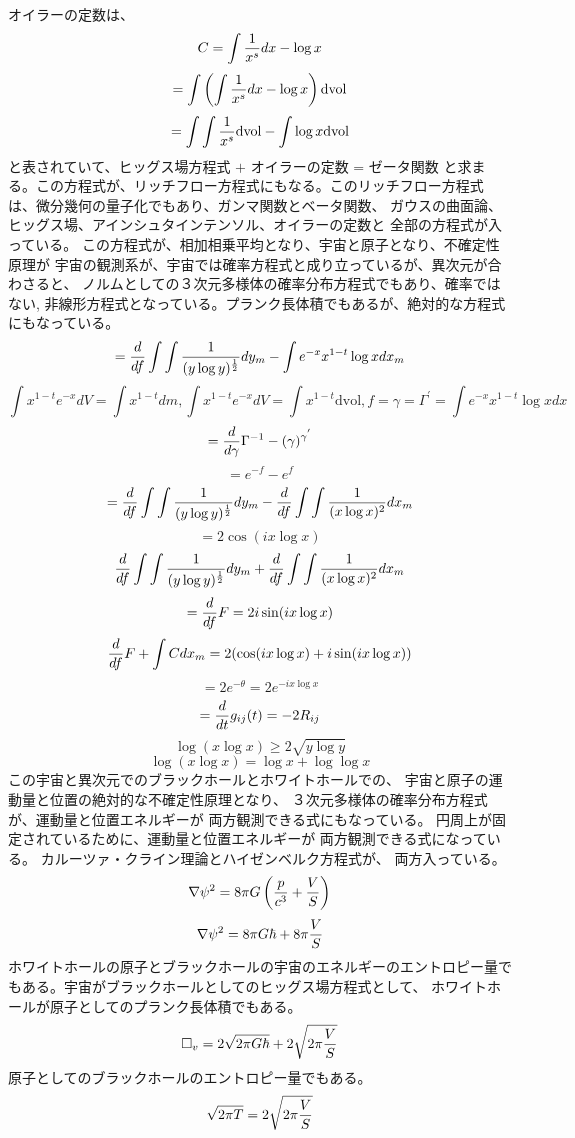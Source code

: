 \documentclass{jsarticle}
\begin{document}
{  オイラーの定数は、
  $$ C = \int {1 \over x^s}dx - \log x $$
  $$ = \int \left(\int {1 \over x^s}dx - \log x \right)\mathrm{dvol} $$
  $$ = \int \int{1 \over x^s}\mathrm{dvol} - \int  \log x \mathrm{dvol} $$
  と表されていて、$ \text{ヒッグス場方程式 + オイラーの定数 = ゼータ関数} $
  と求まる。この方程式が、リッチフロー方程式にもなる。このリッチフロー方程式
  は、微分幾何の量子化でもあり、ガンマ関数とベータ関数、
  ガウスの曲面論、ヒッグス場、アインシュタインテンソル、オイラーの定数と
  全部の方程式が入っている。
  この方程式が、相加相乗平均となり、宇宙と原子となり、不確定性原理が
  宇宙の観測系が、宇宙では確率方程式と成り立っているが、異次元が合わさると、
  ノルムとしての３次元多様体の確率分布方程式でもあり、確率ではない,
  非線形方程式となっている。プランク長体積でもあるが、絶対的な方程式
  にもなっている。
  $$ = {d \over df} \int \int{1 \over (y \log y)^{1 \over 2}}dy_m 
  - \int e^{-x}x^{1 - t} \log x dx_m $$
  $$ \int x^{1 - t}e^{-x}dV = \int x^{1 - t}dm, \int x^{1 - t}e^{-x}dV
  = \int x^{1 - t}\mathrm{dvol}, f = \gamma = \Gamma^{'} = \int 
  e^{-x}x^{1 - t} \log x dx $$
  $$ = {d \over d \gamma}\Gamma^{-1} - (\gamma)^{\gamma^{'}} $$
  $$ = e^{-f} - e^{f} $$
  $$ = {d \over df}\int \int{1 \over (y \log y)^{1 \over 2}}dy_m
  - {d \over df}\int\int {1 \over (x \log x)^2}dx_m $$
  $$ = 2 \cos (i x \log x) $$
  $$  {d \over df}\int\int{1 \over (y \log y)^{1 \over 2}}dy_m
  + {d \over df}\int\int{1 \over (x \log x)^2}dx_m $$
  $$ = {d \over df}F = 2 i \sin (i x \log x) $$
  $$ {d \over df}F + \int C dx_m  
  = 2 (\cos( i x \log x) + i \sin(i x \log x)) $$
  $$ = 2 e^{- \theta} = 2 e^{- i x \log x} $$
  $$ = {d \over dt}g_{ij}(t) = - 2 R_{ij} $$
  $$ \log (x \log x) \ge 2 \sqrt{y \log y} $$
  $$ \log(x \log x) = \log x + \log \log x $$
  この宇宙と異次元でのブラックホールとホワイトホールでの、
  宇宙と原子の運動量と位置の絶対的な不確定性原理となり、
  ３次元多様体の確率分布方程式が、運動量と位置エネルギーが
  両方観測できる式にもなっている。
  円周上が固定されているために、運動量と位置エネルギーが
  両方観測できる式になっている。
  カルーツァ・クライン理論とハイゼンベルク方程式が、
  両方入っている。
  $$ \nabla \psi^2 = 8 \pi G\left({p \over c^3} + {V \over S}\right) $$
  $$ \nabla \psi^2 = 8 \pi G \hbar + 8 \pi {V \over S} $$
  ホワイトホールの原子とブラックホールの宇宙のエネルギーのエントロピー量で
  もある。宇宙がブラックホールとしてのヒッグス場方程式として、
  ホワイトホールが原子としてのプランク長体積でもある。
  $$ \square_v = 2 \sqrt{2 \pi G \hbar} + 2 \sqrt{2 \pi {V \over S}} $$
  原子としてのブラックホールのエントロピー量でもある。
  $$ \sqrt{2 \pi T} = 2 \sqrt{2 \pi{V \over S}} $$

}
\end{document}
